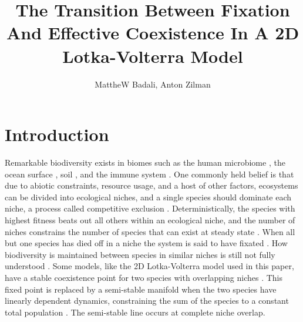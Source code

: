 \documentclass[a4paper,10pt]{article}
\title{The Transition Between Fixation And Effective Coexistence In A 2D Lotka-Volterra Model}
\author{MattheW Badali, Anton Zilman}
\numberwithin{equation}{section} %
\begin{document}
\fi


\section{Introduction}

Remarkable biodiversity exists in biomes such as the human microbiome \cite{Korem2015,Coburn2015,Palmer2001}, the  ocean surface \cite{Hutchinson1961,Cordero2016}, soil \cite{Friedman2016}, and the immune system \cite{Weinstein2009,Desponds2015}. %
One commonly held belief is that due to abiotic constraints, resource usage, and a host of other factors, ecosystems can be divided into ecological niches, and a single species should dominate each niche, a process called competitive exclusion \cite{Hardin1960}. 
Deterministically, the species with highest fitness beats out all others within an ecological niche, and the number of niches constrains the number of species that can exist at steady state \cite{Armstrong1980}. %
When all but one species has died off in a niche the system is said to have fixated \cite{Mayfield2010,Kimura1968,Nadell2013}. 
How biodiversity is maintained between species in similar niches is still not fully understood \cite{May1999,Pennisi2005,Posfai2017}. 
Some models, like the 2D Lotka-Volterra model used in this paper, have a stable coexistence point for two species with overlapping niches \cite{Volterra1926,Bomze1983,Chesson1990,Antal2006}. %
This fixed point is replaced by a semi-stable manifold when the two species have linearly dependent dynamics, constraining the sum of the species to a constant total population \cite{McGehee1977a,Case1979}. %
The semi-stable line occurs at complete niche overlap. 
\end{document}
